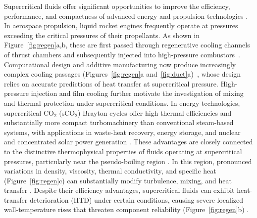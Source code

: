 \documentclass[11pt]{article}
\begin{document}
Supercritical fluids offer significant opportunities to improve the efficiency, performance, and compactness of advanced energy and propulsion technologies \cite{Li2025,Guardone2024}.
In aerospace propulsion, liquid rocket engines frequently operate at pressures exceeding the critical pressures of their propellants.
As shown in Figure~\ref{fig:regen}a,b, these are first passed through regenerative cooling channels of thrust chambers and subsequently injected into high-pressure combustors~\cite{Nasuti2021,JofreUrzay2021}.
Computational design and additive manufacturing now produce increasingly complex cooling passages (Figures~\ref{fig:regen}a and~\ref{fig:duct}a)~\cite{LEAP71,Gradl2019}, whose design relies on accurate predictions of heat transfer at supercritical pressure.
High-pressure injection and film cooling further motivate the investigation of mixing and thermal protection under supercritical conditions.
In energy technologies, supercritical CO$_2$ (sCO$_2$) Brayton cycles offer high thermal efficiencies and substantially more compact turbomachinery than conventional steam-based systems, with applications in waste-heat recovery, energy storage, and nuclear and concentrated solar power generation \cite{Li2025,Guardone2024}.
These advantages are closely connected to the distinctive thermophysical properties of fluids operating at supercritical pressures, particularly near the pseudo-boiling region \cite{Banuti2015}.
In this region, pronounced variations in density, viscosity, thermal conductivity, and specific heat (Figure~\ref{fig:regen}c) can substantially modify turbulence, mixing, and heat transfer \cite{Li2025}.
Despite their efficiency advantages, supercritical fluids can exhibit heat-transfer deterioration (HTD) under certain conditions, causing severe localized wall-temperature rises that threaten component reliability (Figure~\ref{fig:regen}b) \cite{Pizzarelli2018,Nasuti2021,Li2025}.
\end{document}

